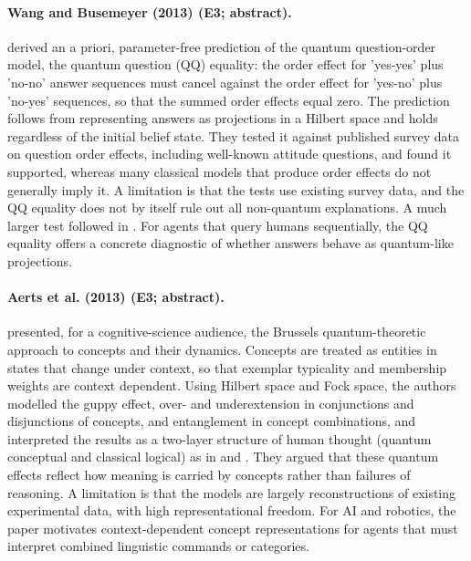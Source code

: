 \documentclass[10pt,a4paper]{article}
\begin{document}
\paragraph{Wang and Busemeyer (2013) (E3; abstract).} \citet{Wang2013b} derived an a priori, parameter-free prediction of the quantum question-order model, the quantum question (QQ) equality: the order effect for 'yes-yes' plus 'no-no' answer sequences must cancel against the order effect for 'yes-no' plus 'no-yes' sequences, so that the summed order effects equal zero. The prediction follows from representing answers as projections in a Hilbert space and holds regardless of the initial belief state. They tested it against published survey data on question order effects, including well-known attitude questions, and found it supported, whereas many classical models that produce order effects do not generally imply it. A limitation is that the tests use existing survey data, and the QQ equality does not by itself rule out all non-quantum explanations. A much larger test followed in \citep{Wang2014}. For agents that query humans sequentially, the QQ equality offers a concrete diagnostic of whether answers behave as quantum-like projections.

\paragraph{Aerts et al. (2013) (E3; abstract).} \citet{Aerts2013} presented, for a cognitive-science audience, the Brussels quantum-theoretic approach to concepts and their dynamics. Concepts are treated as entities in states that change under context, so that exemplar typicality and membership weights are context dependent. Using Hilbert space and Fock space, the authors modelled the guppy effect, over- and underextension in conjunctions and disjunctions of concepts, and entanglement in concept combinations, and interpreted the results as a two-layer structure of human thought (quantum conceptual and classical logical) as in \citep{Aerts2009} and \citep{Aerts2011a}. They argued that these quantum effects reflect how meaning is carried by concepts rather than failures of reasoning. A limitation is that the models are largely reconstructions of existing experimental data, with high representational freedom. For AI and robotics, the paper motivates context-dependent concept representations for agents that must interpret combined linguistic commands or categories.
\end{document}
